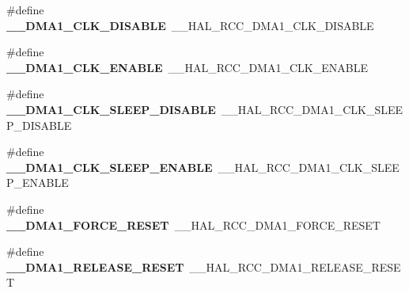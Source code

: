 \begin{DoxyCompactItemize}
\item 
\mbox{\label{group___h_a_l___r_c_c___aliased_ga153f57f9b39b25f0e6cde82e6d84473d}} 
\#define {\bfseries \+\_\+\+\_\+\+D\+M\+A1\+\_\+\+C\+L\+K\+\_\+\+D\+I\+S\+A\+B\+LE}~\+\_\+\+\_\+\+H\+A\+L\+\_\+\+R\+C\+C\+\_\+\+D\+M\+A1\+\_\+\+C\+L\+K\+\_\+\+D\+I\+S\+A\+B\+LE
\item 
\mbox{\label{group___h_a_l___r_c_c___aliased_gab7bc4cf6efeb1ea610682993cea17995}} 
\#define {\bfseries \+\_\+\+\_\+\+D\+M\+A1\+\_\+\+C\+L\+K\+\_\+\+E\+N\+A\+B\+LE}~\+\_\+\+\_\+\+H\+A\+L\+\_\+\+R\+C\+C\+\_\+\+D\+M\+A1\+\_\+\+C\+L\+K\+\_\+\+E\+N\+A\+B\+LE
\item 
\mbox{\label{group___h_a_l___r_c_c___aliased_ga78df1bf8400fee8e98d8ba43312bdc5e}} 
\#define {\bfseries \+\_\+\+\_\+\+D\+M\+A1\+\_\+\+C\+L\+K\+\_\+\+S\+L\+E\+E\+P\+\_\+\+D\+I\+S\+A\+B\+LE}~\+\_\+\+\_\+\+H\+A\+L\+\_\+\+R\+C\+C\+\_\+\+D\+M\+A1\+\_\+\+C\+L\+K\+\_\+\+S\+L\+E\+E\+P\+\_\+\+D\+I\+S\+A\+B\+LE
\item 
\mbox{\label{group___h_a_l___r_c_c___aliased_ga38e380cb1fa25bab0fe185f9dc8a1c03}} 
\#define {\bfseries \+\_\+\+\_\+\+D\+M\+A1\+\_\+\+C\+L\+K\+\_\+\+S\+L\+E\+E\+P\+\_\+\+E\+N\+A\+B\+LE}~\+\_\+\+\_\+\+H\+A\+L\+\_\+\+R\+C\+C\+\_\+\+D\+M\+A1\+\_\+\+C\+L\+K\+\_\+\+S\+L\+E\+E\+P\+\_\+\+E\+N\+A\+B\+LE
\item 
\mbox{\label{group___h_a_l___r_c_c___aliased_ga1b49adf6ce960db1fc3e97c015904a4e}} 
\#define {\bfseries \+\_\+\+\_\+\+D\+M\+A1\+\_\+\+F\+O\+R\+C\+E\+\_\+\+R\+E\+S\+ET}~\+\_\+\+\_\+\+H\+A\+L\+\_\+\+R\+C\+C\+\_\+\+D\+M\+A1\+\_\+\+F\+O\+R\+C\+E\+\_\+\+R\+E\+S\+ET
\item 
\mbox{\label{group___h_a_l___r_c_c___aliased_ga30b3a917fca9f9ea9004c310ed3cefe6}} 
\#define {\bfseries \+\_\+\+\_\+\+D\+M\+A1\+\_\+\+R\+E\+L\+E\+A\+S\+E\+\_\+\+R\+E\+S\+ET}~\+\_\+\+\_\+\+H\+A\+L\+\_\+\+R\+C\+C\+\_\+\+D\+M\+A1\+\_\+\+R\+E\+L\+E\+A\+S\+E\+\_\+\+R\+E\+S\+ET
\item 
\mbox{\label{group___h_a_l___r_c_c___aliased_ga3666b12e99818df90eca5d8c53376d0f}} 

\end{DoxyCompactItemize}
